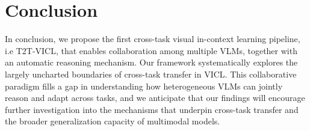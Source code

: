 \section{Conclusion}
\label{sec:concl}

In conclusion, we propose the first cross-task visual in-context learning pipeline, i.e T2T-VICL, that enables collaboration among multiple VLMs, together with an automatic reasoning mechanism. Our framework systematically explores the largely uncharted boundaries of cross-task transfer in VICL. This collaborative paradigm fills a gap in understanding how heterogeneous VLMs can jointly reason and adapt across tasks, and we anticipate that our findings will encourage further investigation into the mechanisms that underpin cross-task transfer and the broader generalization capacity of multimodal models.
